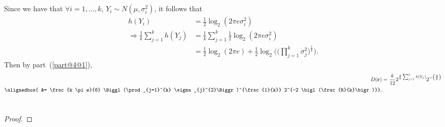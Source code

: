 \documentclass[
  coursecode={MTHE 477},
  assignmentname={Homework \homeworknumber},
  studentnumber=20053722,
  name={Bryan Hoang},
  draft,
]{
  ltxanswer%
}
\begin{document}
\begin{questions}
\begin{parts}
      \part{}
      \begin{solution}
        Since we have that \(\forall i = 1, \dotsc, k\), \(Y_{i} \sim N(\mu, \sigma_{i}^{2})\), it follows that
        \begin{align*}
          h(Y_{i})                                        &= \frac{1}{2} \log_{2}(2\pi e \sigma_{i}^{2})                                                                                  \\
          \Rightarrow \frac{1}{k} \sum_{j=1}^{k} h(Y_{j}) &= \frac{1}{k} \sum_{j=1}^{k} \frac{1}{2} \log_{2}(2\pi e \sigma_{i}^{2})                                                       \\
                                                          &= \frac{1}{2} \log_{2}(2\pi e) + \frac{1}{2} \log_{2}\Biggl(\Biggl(\prod_{j=1}^{k} \sigma_{j}^{2}\Biggr)^{\frac{1}{k}}\Biggr).
        \end{align*}
        Then by part~(\ref{part@4@1}),
        \begin{align*}
          D(\mathbf{r}) &= \frac{k}{12} 2^{\frac{2}{k} \sum_{j=1}^{k} h(Y_{j})} 2^{-\bigl(\frac{R}{k}\bigr)}                             \\
          \alignedbox{  &= \frac{k \pi e}{6} \Biggl(\prod_{j=1}^{k} \sigma_{j}^{2}\Biggr)^{\frac{1}{k}} 2^{-2 \bigl(\frac{R}{k}\bigr)}}.
        \end{align*}
      \end{solution}

      \part{}
      \begin{solution}
        \begin{proof}
        \end{proof}
      \end{solution}
    \end{parts}
  \end{questions}
\end{document}

